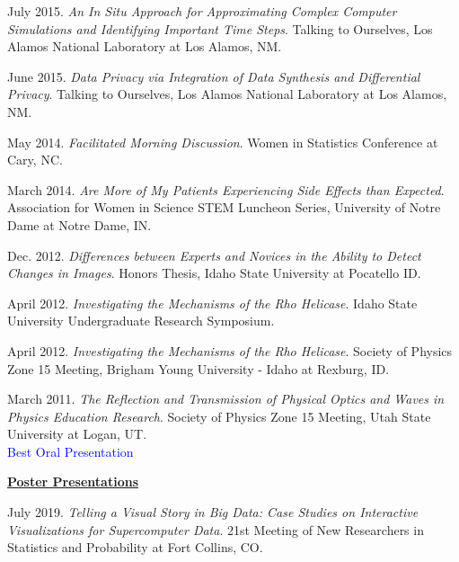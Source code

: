 \documentclass[11pt, letterpaper, roman]{moderncv} %
\begin{document}
\begin{etaremune}[topsep=0pt, itemsep=3pt, partopsep=0pt, parsep=0pt]
    \item July 2015. \textit{An In Situ Approach for Approximating Complex Computer Simulations and Identifying Important Time Steps}. Talking to Ourselves, Los Alamos National Laboratory at Los Alamos, NM.
    
    \item June 2015. \textit{Data Privacy via Integration of Data Synthesis and Differential Privacy}. Talking to Ourselves, Los Alamos National Laboratory at Los Alamos, NM. 
    
    \item May 2014. \textit{Facilitated Morning Discussion}. Women in Statistics Conference at Cary, NC.
    
    \item March 2014. \textit{Are More of My Patients Experiencing Side Effects than Expected}. Association for Women in Science STEM Luncheon Series, University of Notre Dame at Notre Dame, IN.
    
    \item Dec. 2012. \textit{Differences between Experts and Novices in the Ability to Detect Changes in Images}. Honors Thesis, Idaho State University at Pocatello ID.
    
    \item April 2012. \textit{Investigating the Mechanisms of the Rho Helicase}. Idaho State University Undergraduate Research Symposium.
    
    \item April 2012. \textit{Investigating the Mechanisms of the Rho Helicase}. Society of Physics Zone 15 Meeting, Brigham Young University - Idaho at Rexburg, ID.
    
    \item March 2011. \textit{The Reflection and Transmission of Physical Optics and Waves in Physics Education Research}. Society of Physics Zone 15 Meeting, Utah State University at Logan, UT.\\
    \textcolor{blue}{Best Oral Presentation}
  
\vspace{10pt}
\hspace{-0.30in}\underline{\textbf{\large Poster Presentations}}\normalsize
    \item July 2019. \textit{Telling a Visual Story in Big Data: Case Studies on Interactive Visualizations for Supercomputer Data}. 21st Meeting of New Researchers in Statistics and Probability at Fort Collins, CO.
    

\end{etaremune}
\end{document}
